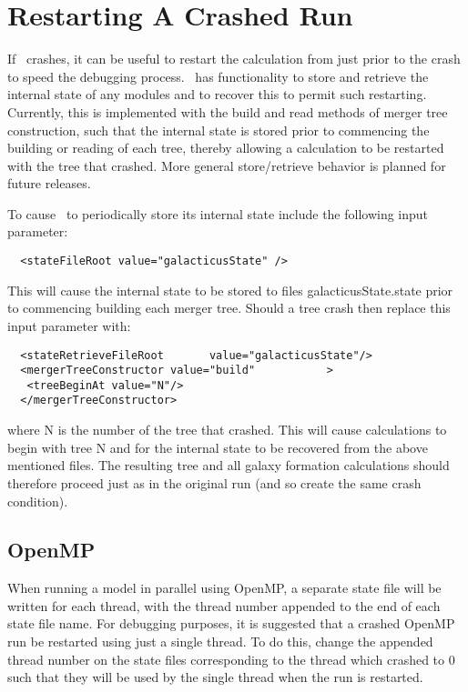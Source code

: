 \section{Restarting A Crashed Run}\label{sec:Restarting}

If \glc\ crashes, it can be useful to restart the calculation from just prior to the crash to speed the debugging process. \glc\ has functionality to store and retrieve the internal state of any modules and to recover this to permit such restarting. Currently, this is implemented with the {\normalfont \ttfamily build} and {\normalfont \ttfamily read} methods of merger tree construction, such that the internal state is stored prior to commencing the building or reading of each tree, thereby allowing a calculation to be restarted with the tree that crashed. More general store/retrieve behavior is planned for future releases.

To cause \glc\ to periodically store its internal state include the following input parameter:
\begin{verbatim}
  <stateFileRoot value="galacticusState" />
\end{verbatim}
This will cause the internal state to be stored to files {\normalfont \ttfamily galacticusState.state} prior to commencing building each merger tree. Should a tree crash then replace this input parameter with:
\begin{verbatim}
  <stateRetrieveFileRoot       value="galacticusState"/>
  <mergerTreeConstructor value="build"           >
   <treeBeginAt value="N"/>
  </mergerTreeConstructor>
\end{verbatim}
where {\normalfont \ttfamily N} is the number of the tree that crashed. This will cause calculations to begin with tree {\normalfont \ttfamily N} and for the internal state to be recovered from the above mentioned files. The resulting tree and all galaxy formation calculations should therefore proceed just as in the original run (and so create the same crash condition).

\subsection{OpenMP}

When running a model in parallel using OpenMP, a separate state file will be written for each thread, with the thread number appended to the end of each state file name. For debugging purposes, it is suggested that a crashed OpenMP run be restarted using just a single thread. To do this, change the appended thread number on the state files corresponding to the thread which crashed to 0 such that they will be used by the single thread when the run is restarted.

